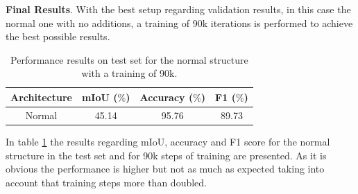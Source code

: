 \textbf{Final Results}. With the best setup regarding validation results, in this case the normal one with no additions, a training of 90k iterations is performed to achieve the best possible results.\newline

\begin{table}[h!]
  \begin{center}
    
    \begin{tabular}{|c|c|c|c|} %
      \textbf{Architecture} & \textbf{mIoU ($\%$)} & \textbf{Accuracy ($\%$)} & \textbf{F1 ($\%$)} \\
      \hline
      Normal & 45.14 & 95.76 & 89.73\\
    \end{tabular}
    \caption{Performance results on test set for the normal structure with a training of 90k.}
    \label{icnet:table3}
  \end{center}
\end{table}

In table \ref{icnet:table3} the results regarding mIoU, accuracy and F1 score for the normal structure in the test set and for 90k steps of training are presented. As it is obvious the performance is higher but not as much as expected taking into account that training steps more than doubled.\newline

